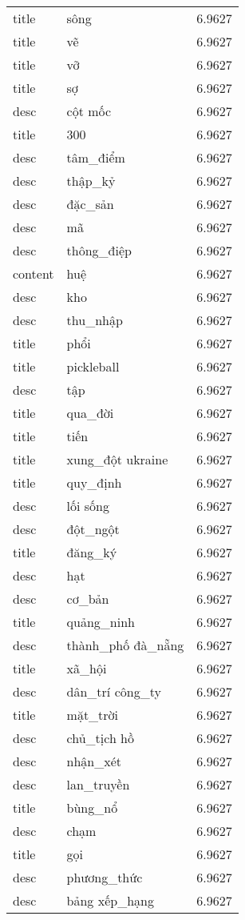 \documentclass{article}
\begin{document}
\begin{tabular}{lll}
title & sông & 6.9627\\
title & vẽ & 6.9627\\
title & vỡ & 6.9627\\
title & sợ & 6.9627\\
desc & cột mốc & 6.9627\\
title & 300 & 6.9627\\
desc & tâm\_điểm & 6.9627\\
desc & thập\_kỷ & 6.9627\\
desc & đặc\_sản & 6.9627\\
desc & mã & 6.9627\\
desc & thông\_điệp & 6.9627\\
content & huệ & 6.9627\\
desc & kho & 6.9627\\
desc & thu\_nhập & 6.9627\\
title & phổi & 6.9627\\
title & pickleball & 6.9627\\
desc & tập & 6.9627\\
title & qua\_đời & 6.9627\\
title & tiến & 6.9627\\
title & xung\_đột ukraine & 6.9627\\
title & quy\_định & 6.9627\\
desc & lối sống & 6.9627\\
desc & đột\_ngột & 6.9627\\
title & đăng\_ký & 6.9627\\
desc & hạt & 6.9627\\
desc & cơ\_bản & 6.9627\\
title & quảng\_ninh & 6.9627\\
desc & thành\_phố đà\_nẵng & 6.9627\\
title & xã\_hội & 6.9627\\
desc & dân\_trí công\_ty & 6.9627\\
title & mặt\_trời & 6.9627\\
desc & chủ\_tịch hồ & 6.9627\\
desc & nhận\_xét & 6.9627\\
desc & lan\_truyền & 6.9627\\
title & bùng\_nổ & 6.9627\\
desc & chạm & 6.9627\\
title & gọi & 6.9627\\
desc & phương\_thức & 6.9627\\
desc & bảng xếp\_hạng & 6.9627\\

\end{tabular}
\end{document}
